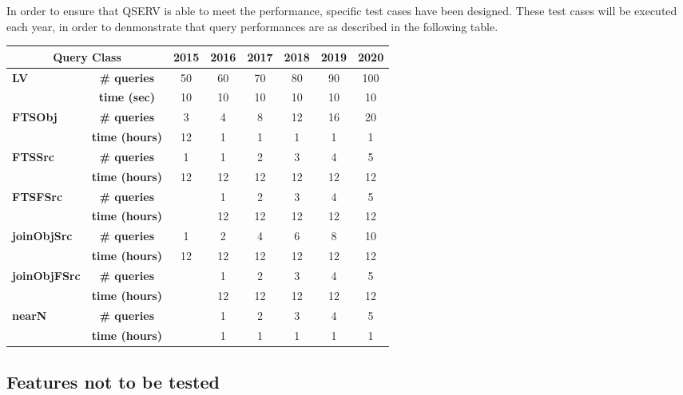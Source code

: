 \documentclass[DM,lsstdraft,STS,toc]{lsstdoc}
\begin{document}
In order to ensure that QSERV is able to meet the performance, specific test cases have been designed.
These test cases will be executed each year, in order to denmonstrate that query performances are as described in the following table.


    \begin{tabular}{|l|c|c|c|c|c|c|c|}\hline
      \multicolumn{2}{|c|}{\textbf{Query Class}}
        &\textbf{2015}&\textbf{2016}&\textbf{2017}&\textbf{2018}&\textbf{2019}&\textbf{2020}\\\hline
      \multirow{2}{*}{\textbf{LV}}
        &\textbf{\# queries}  & 50 & 60 & 70 & 80 & 90 & 100 \\%
        &\textbf{time (sec)}  & 10 & 10 & 10 & 10 & 10 &  10 \\\hline
      \multirow{2}{*}{\textbf{FTSObj}}
        &\textbf{\# queries}  &  3 &  4 &  8 & 12 & 16 &  20 \\%
        &\textbf{time (hours)}& 12 &  1 &  1 &  1 &  1 &   1 \\\hline
      \multirow{2}{*}{\textbf{FTSSrc}}
        &\textbf{\# queries}  &  1 &  1 &  2 &  3 &  4 &   5 \\%
        &\textbf{time (hours)}& 12 & 12 & 12 & 12 & 12 &  12 \\\hline
      \multirow{2}{*}{\textbf{FTSFSrc}}
        &\textbf{\# queries}  &    &  1 &  2 &  3 &  4 &   5 \\%
        &\textbf{time (hours)}&    & 12 & 12 & 12 & 12 &  12 \\\hline
      \multirow{2}{*}{\textbf{joinObjSrc}}
        &\textbf{\# queries}  &  1 &  2 &  4 &  6 &  8 &  10 \\%
        &\textbf{time (hours)}& 12 & 12 & 12 & 12 & 12 &  12 \\\hline
      \multirow{2}{*}{\textbf{joinObjFSrc}}
        &\textbf{\# queries}  &    &  1 &  2 &  3 &  4 &   5 \\%
        &\textbf{time (hours)}&    & 12 & 12 & 12 & 12 &  12 \\\hline
      \multirow{2}{*}{\textbf{nearN}}
        &\textbf{\# queries}  &    &  1 &  2 &  3 &  4 &   5 \\%
        &\textbf{time (hours)}&    &  1 &  1 &  1 &  1 &   1 \\\hline
    \end{tabular}


\subsection{Features not to be tested}
\label{sec:featnot2test}
\end{document}
